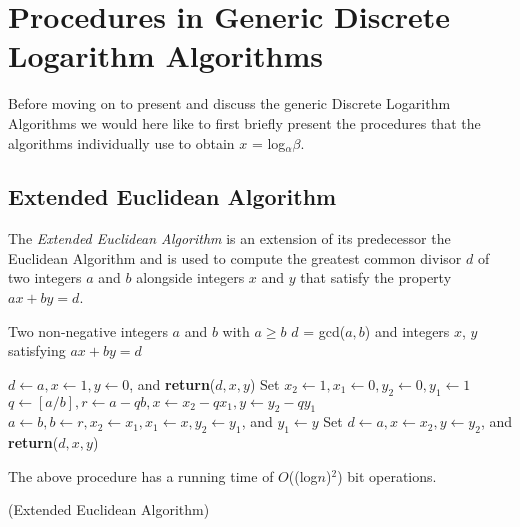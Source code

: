 \documentclass[iwp,first]{luthesis}
\begin{document}
\section{Procedures in Generic Discrete Logarithm Algorithms}

Before moving on to present and discuss the generic Discrete Logarithm Algorithms we would here like to first briefly present the procedures that the algorithms individually use to obtain $x$ = log$_{\alpha}\beta$.

\subsection{Extended Euclidean Algorithm}

The \textit{Extended Euclidean Algorithm} is an extension of its predecessor the Euclidean Algorithm and is used to compute the greatest common divisor $d$ of two integers $a$ and $b$ alongside integers $x$ and $y$ that satisfy the property $ax + by =d$.

\begin{algorithm}
\caption{Extended Euclidean Algorithm}
\begin{algorithmic}
\REQUIRE Two non-negative integers $a$ and $b$ with $a \geq b$
\ENSURE $d$ = gcd($a, b$) and integers $x$, $y$ satisfying $ax + by = d$
\begin{enumerate}
\STATE $d \leftarrow a, x \leftarrow 1, y \leftarrow 0$, and \textbf{return}($d,x,y$)
\ENDIF
\STATE Set $x_{2} \leftarrow 1, x_{1} \leftarrow 0, y_{2} \leftarrow 0, y_{1} \leftarrow 1$
\STATE $q \leftarrow [a/b], r \leftarrow a-qb, x \leftarrow x_{2}-qx_{1}, y \leftarrow y_{2}-qy_{1}$
\STATE $a \leftarrow b, b \leftarrow r, x_{2} \leftarrow x_{1}, x_{1} \leftarrow x, y_{2} \leftarrow y_{1}$, and $y_{1} \leftarrow y$
\ENDWHILE 
\STATE Set $d \leftarrow a, x \leftarrow x_{2}, y \leftarrow y_{2}$, and \textbf{return}($d,x,y$)
\end{enumerate}
\end{algorithmic}
\end{algorithm}

The above procedure has a running time of $O$((log$n$)$^2$) bit operations.

\begin{example}{(Extended Euclidean Algorithm)}
\end{example}
\end{document}
